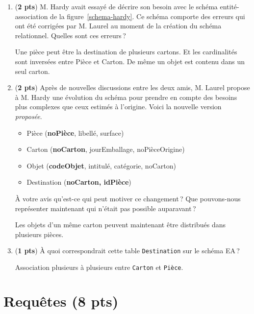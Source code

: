 \begin{enumerate}
    \item ({\bf 2 pts}) M. Hardy avait essayé de décrire son besoin avec le
      schéma entité-association de la figure~\ref{schema-hardy}.
     Ce schéma comporte des erreurs qui ont été corrigées 
       par M. Laurel
       au moment de la création du schéma relationnel. Quelles
       sont ces erreurs\,?

\begin{solution}
Une pièce peut être la destination de plusieurs
cartons. Et les cardinalités sont inversées entre Pièce et Carton.
De même un
objet est contenu dans un seul carton.
\end{solution}
 
 \item ({\bf 2 pts}) Après de nouvelles discussions entre les deux amis, M. Laurel 
        propose à M. Hardy une évolution du schéma pour prendre en compte
        des besoins plus complexes que ceux estimés à l'origine. Voici
        la nouvelle version \emph{proposée}.
        
      \begin{itemize}
        \item Pièce (\textbf{noPièce}, libellé, surface)
        \item Carton (\textbf{noCarton}, jourEmballage, noPièceOrigine)
        \item  Objet (\textbf{codeObjet}, intitulé, catégorie,
                     noCarton)
        \item Destination (\textbf{noCarton, idPièce})
       \end{itemize}
  À votre avis qu'est-ce qui peut motiver ce changement\,? Que pouvons-nous
 représenter maintenant qui n'était pas possible auparavant\,?
 
\begin{solution}
 Les objets d'un même carton peuvent maintenant être distribués dans plusieurs pièces.
\end{solution}
 

 \item ({\bf 1 pts}) À quoi correspondrait cette table \texttt{Destination} sur le schéma
 EA\,?

\begin{solution}
Association plusieurs à plusieurs entre \texttt{Carton} et \texttt{Pièce}.
\end{solution}
\end{enumerate}

\section{Requêtes (8 pts)}


